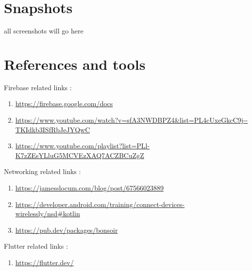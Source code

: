 \documentclass{article}
\begin{document}
\section{Snapshots}
all screenshots will go here

\section{References and tools}
Firebase related links :
\begin{enumerate}
    \item \url{https://firebase.google.com/docs}
    \item \url{https://www.youtube.com/watch?v=sfA3NWDBPZ4&list=PL4cUxeGkcC9j--TKIdkb3ISfRbJeJYQwC}
    \item \url{https://www.youtube.com/playlist?list=PLl-K7zZEsYLluG5MCVEzXAQ7ACZBCuZgZ}
\end{enumerate}
Networking related links :
\begin{enumerate}
    \item \url{https://jamesslocum.com/blog/post/67566023889}
    \item \url{https://developer.android.com/training/connect-devices-wirelessly/nsd#kotlin}
    \item \url{https://pub.dev/packages/bonsoir}
\end{enumerate}
Flutter related links :
\begin{enumerate}
    \item \url{https://flutter.dev/}
\end{enumerate}
\end{document}
